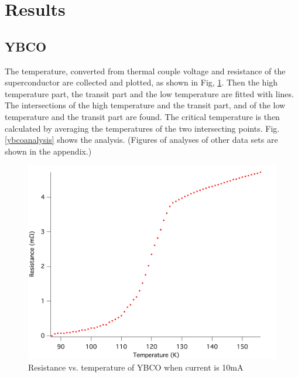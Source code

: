 \documentclass[prb,preprint]{revtex4-1}
\begin{document}
\section{Results}

\subsection{YBCO}
The temperature, converted from thermal couple voltage and resistance of the superconductor are collected and plotted, as shown in Fig, \ref{ybco10ma}. Then the high temperature part, the transit part and the low temperature are fitted with lines. The intersections of the high temperature and the transit part, and of the low temperature and the transit part are found. The critical temperature is then calculated by averaging the temperatures of the two intersecting points. Fig. \ref{ybcoanalysis} shows the analysis. (Figures of analyses of other data sets are shown in the appendix.)

\begin{figure}[h]
\centering
\includegraphics[width=14cm]{ybco10ma_raw.png}
\caption{Resistance vs. temperature of YBCO when current is 10mA}
\label{ybco10ma}
\end{figure}
\end{document}
